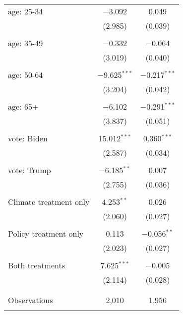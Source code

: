 \begin{tabular}{@{\extracolsep{5pt}}lcc}
 age: 25-34 & $-$3.092 & 0.049 \\ 
  & (2.985) & (0.039) \\ 
  & & \\ 
 age: 35-49 & $-$0.332 & $-$0.064 \\ 
  & (3.019) & (0.040) \\ 
  & & \\ 
 age: 50-64 & $-$9.625$^{***}$ & $-$0.217$^{***}$ \\ 
  & (3.204) & (0.042) \\ 
  & & \\ 
 age: 65+ & $-$6.102 & $-$0.291$^{***}$ \\ 
  & (3.837) & (0.051) \\ 
  & & \\ 
 vote: Biden & 15.012$^{***}$ & 0.360$^{***}$ \\ 
  & (2.587) & (0.034) \\ 
  & & \\ 
 vote: Trump & $-$6.185$^{**}$ & 0.007 \\ 
  & (2.755) & (0.036) \\ 
  & & \\ 
 Climate treatment only & 4.253$^{**}$ & 0.026 \\ 
  & (2.060) & (0.027) \\ 
  & & \\ 
 Policy treatment only & 0.113 & $-$0.056$^{**}$ \\ 
  & (2.023) & (0.027) \\ 
  & & \\ 
 Both treatments & 7.625$^{***}$ & $-$0.005 \\ 
  & (2.114) & (0.028) \\ 
  & & \\ 
\hline \\[-1.8ex] 

Observations & 2,010 & 1,956 \\ 
\hline 
\hline \\[-1.8ex] 
\end{tabular} 